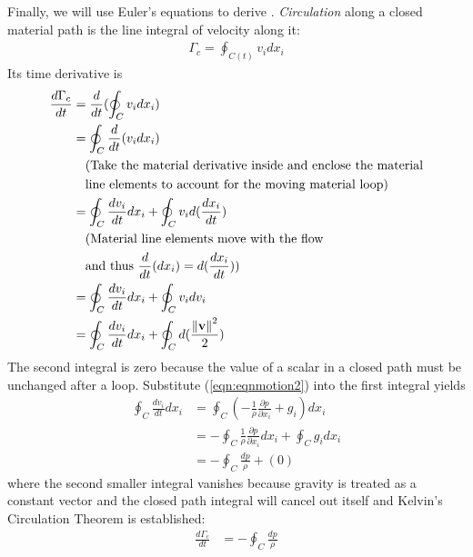 Finally, we will use Euler's equations to derive . \textit{Circulation} along a closed material path is the line integral of velocity along it:
\begin{align}
\Gamma_c = \oint_{C(t)} v_i dx_i
\end{align}
Its time derivative is 
\begin{align}
\frac{d\Gamma_c}{dt} &= \frac{d}{dt}(\oint_{C} v_i dx_i) \nonumber \\
&= \oint_{C} \frac{d}{dt}(v_i dx_i)  \nonumber \\\
&\quad \begin{aligned}
&\text{(Take the material derivative inside and enclose the material} \\  
&\text{line elements to account for the moving material loop)} 
\end{aligned} \nonumber \\
&= \oint_{C} \frac{dv_i}{dt} dx_i + \oint_{C} v_i d(\frac{dx_i}{dt})  \nonumber \\
&\quad \begin{aligned}
&\text{(Material line elements move with the flow} \\ 
&\text{and thus } \frac{d}{dt}(dx_i) = d(\frac{dx_i}{dt})\text{)}\end{aligned} \nonumber \\
&= \oint_{C} \frac{dv_i}{dt} dx_i + \oint_{C} v_i dv_i \nonumber \\
&= \oint_{C} \frac{dv_i}{dt} dx_i + \oint_{C} d(\frac{\norm{\textbf{v}}^2}{2}) 
\end{align}
The second integral is zero because the value of a scalar in a closed path must be unchanged after a loop. Substitute (\ref{eqn:eqnmotion2}) into the first integral yields
\begin{align*}
\oint_{C} \frac{dv_i}{dt} dx_i &= \oint_{C} (-\frac{1}{\rho}\frac{\partial p}{\partial x_i} + g_i) dx_i \\
&= - \oint_{C} \frac{1}{\rho}\frac{\partial p}{\partial x_i} dx_i + \oint_{C} g_i dx_i \\
&= - \oint_C \frac{dp}{\rho} + (0)
\end{align*}
where the second smaller integral vanishes because gravity is treated as a constant vector and the closed path integral will cancel out itself and Kelvin's Circulation Theorem is established:
\begin{align}
\frac{d\Gamma_c}{dt} &= - \oint_C \frac{dp}{\rho}  
\end{align}
